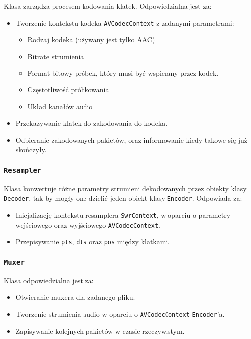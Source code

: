 \documentclass[a4paper,12pt]{article}
\begin{document}
Klasa zarządza procesem kodowania klatek. Odpowiedzialna jest za: 
\begin{itemize}
    \item Tworzenie kontekstu kodeka \texttt{AVCodecContext} z zadanymi
        parametrami: 
        \begin{itemize}
            \item Rodzaj kodeka (używany jest tylko AAC)
            \item Bitrate strumienia
            \item Format bitowy próbek, który musi być wspierany przez kodek.
            \item Częstotliwość próbkowania
            \item Układ kanałów audio
        \end{itemize}
    \item Przekazywanie klatek do zakodowania do kodeka.
    \item Odbieranie zakodowanych pakietów, oraz informowanie kiedy takowe się
        już skończyły.
\end{itemize}

\subsubsection{\texttt{Resampler}}

Klasa konwertuje różne parametry strumieni dekodowanych przez obiekty klasy
\texttt{Decoder}, tak by mogły one dzielić jeden obiekt klasy \texttt{Encoder}.
Odpowiada za: 
\begin{itemize}
    \item Inicjalizację kontekstu resamplera \texttt{SwrContext}, w oparciu o
        parametry wejściowego oraz wyjściowego \texttt{AVCodecContext}.
    \item Przepisywanie \texttt{pts}, \texttt{dts} oraz \texttt{pos} między klatkami.
\end{itemize}

\subsubsection{\texttt{Muxer}}

Klasa odpowiedzialna jest za: 
\begin{itemize}
    \item Otwieranie muxera dla zadanego pliku. 
    \item Tworzenie strumienia audio w oparciu o \texttt{AVCodecContext}
        \texttt{Encoder}'a.
    \item Zapisywanie kolejnych pakietów w czasie rzeczywistym.
\end{itemize}
\end{document}
